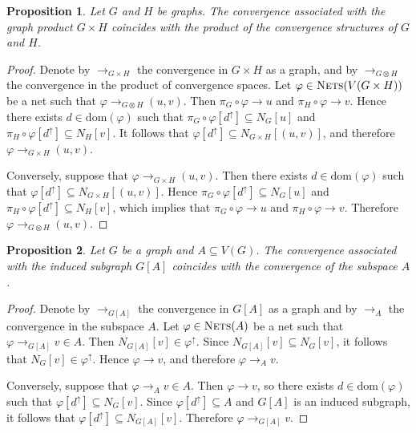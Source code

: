 \documentclass{amsart}
\newtheorem{proposition}{Proposition}[section]
\theoremstyle{definition}
\theoremstyle{remark}
\numberwithin{equation}{section}
\begin{document}
\begin{proposition}
	\label{prod}
Let $G$ and $H$ be graphs. The convergence associated with the graph product 
$G\times H$ coincides with the product of the convergence structures of $G$ and $H$.
\end{proposition}
\begin{proof}
Denote by $\to_{G\times H}$ the convergence in $G\times H$ as a graph, and by 
$\to_{G\otimes H}$ the convergence in the product of convergence spaces. 
Let $\varphi\in \textsc{Nets}(V(G\times H))$ be a net such that 
$\varphi\to_{G\otimes H} (u,v)$. Then $\pi_G\circ\varphi\to u$ and 
$\pi_H\circ\varphi\to v$. Hence there exists $d\in\mathrm{dom}(\varphi)$ such that
$\pi_G\circ\varphi[d^\uparrow]\subseteq N_G[u]$ and 
$\pi_H\circ\varphi[d^\uparrow]\subseteq N_H[v]$. 
It follows that $\varphi[d^\uparrow]\subseteq N_{G\times H}[(u,v)]$, and therefore 
$\varphi\to_{G\times H}(u,v)$.

Conversely, suppose that $\varphi\to_{G\times H}(u,v)$. Then there exists 
$d\in\mathrm{dom}(\varphi)$ such that 
$\varphi[d^\uparrow]\subseteq N_{G\times H}[(u,v)]$. 
Hence $\pi_G\circ\varphi[d^\uparrow]\subseteq N_G[u]$ and 
$\pi_H\circ\varphi[d^\uparrow]\subseteq N_H[v]$, which implies that 
$\pi_G\circ\varphi\to u$ and $\pi_H\circ\varphi\to v$. 
Therefore $\varphi\to_{G\otimes H}(u,v)$.
\end{proof}



\begin{proposition}
	\label{sub}
Let $G$ be a graph and $A\subseteq V(G)$. The convergence associated with the 
induced subgraph $G[A]$ coincides with the convergence of the subspace $A$.
\end{proposition}
\begin{proof}
Denote by $\to_{G[A]}$ the convergence in $G[A]$ as a graph and by $\to_A$ the convergence in the subspace $A$. 
Let $\varphi\in\textsc{Nets}(A)$ be a net such that $\varphi\to_{G[A]} v\in A$. 
Then $N_{G[A]}[v]\in\varphi^\uparrow$. Since $N_{G[A]}[v]\subseteq N_G[v]$, it follows that $N_G[v]\in\varphi^\uparrow$. 
Hence $\varphi\to v$, and therefore $\varphi\to_A v$.

Conversely, suppose that $\varphi\to_A v\in A$. Then $\varphi\to v$, so there exists $d\in\mathrm{dom}(\varphi)$ such that $\varphi[d^\uparrow]\subseteq N_G[v]$. 
Since $\varphi[d^\uparrow]\subseteq A$ and $G[A]$ is an induced subgraph, it follows that $\varphi[d^\uparrow]\subseteq N_{G[A]}[v]$. 
Therefore $\varphi\to_{G[A]} v$.
\end{proof}
\end{document}
